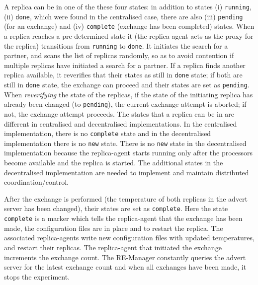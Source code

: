\documentclass{rspublic}
\newcommand{\jhanote}[1]{ {\textcolor{red} { ***shantenu: #1 }}}
\newcommand{\athotanote}[1]{ {\textcolor{green} { ***athota: #1 }}}
\newcommand{\athotanote}[1]{}
\newcommand{\jhanote}[1]{}
\begin{document}
A replica can be in one of the these four states: in addition to
states (i) \texttt{running}, (ii) \texttt{done}, which were found in
the centralised case, there are also (iii) \texttt{pending} (for an
exchange) and (iv) \texttt{complete} (exchange has been completed)
states.  When a replica reaches a pre-determined state it (the
replica-agent acts as the proxy for the replica) transitions from
\texttt{running} to \texttt{done}. It initiates the search for a
partner, and scans the list of replicas randomly, so as to avoid
contention if multiple replicas have initiated a search for a partner.
If a replica finds another replica available, it reverifies that their
states as still in \texttt{done} state; if both are still in
\texttt{done} state, the exchange can proceed and their states are set
as \texttt{pending}.  When {\it reverifying} the state of the
replicas, if the state of the initiating replica has already been
changed (to \texttt{pending}), the current exchange attempt is
aborted; if not, the exchange attempt proceeds. The states that a
replica can be in are different in centralised and decentralised
implementations. In the centralised implementation, there is no
\texttt{complete} state and in the decentralised implementation there
is no \texttt{new} state. There is no \texttt{new} state in the
decentralised implementation because the replica-agent starts running
only after the processors become available and the replica is
started. The additional states in the decentralised implementation are
needed to implement and maintain distributed coordination/control.



After the exchange is performed (the temperature of both replicas in
the advert server has been changed), their states are set as
\texttt{complete}. Here the state \texttt{complete} is a marker
which tells the replica-agent that the exchange has been made, the
configuration files are in place and to restart the replica.  
The associated replica-agents write new
configuration files with updated temperatures, and restart their
replicas. The replica-agent that initiated the exchange increments the
exchange count. The RE-Manager constantly queries the advert server
for the latest exchange count and when all exchanges have been made,
it stops the experiment.
\end{document}
